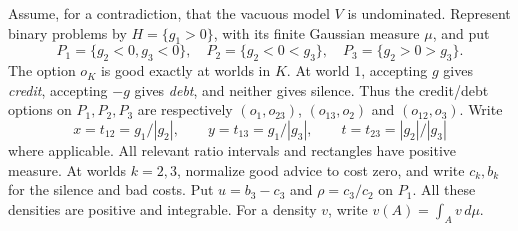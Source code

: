 \documentclass[11pt]{article}
\theoremstyle{remark}\newtheorem{remark}[theorem]{Remark}
\begin{document}
Assume, for a contradiction, that the vacuous model $V$ is undominated.
Represent binary problems by $H=\{g_1>0\}$, with its finite Gaussian measure
$\mu$, and put
\[
 P_1=\{g_2<0,g_3<0\},\quad P_2=\{g_2<0<g_3\},\quad
 P_3=\{g_2>0>g_3\}.
\]
The option $o_K$ is good exactly at worlds in $K$. At world $1$, accepting
$g$ gives \emph{credit}, accepting $-g$ gives \emph{debt}, and neither gives
silence. Thus the credit/debt options on $P_1,P_2,P_3$ are respectively
$(o_1,o_{23})$, $(o_{13},o_2)$ and $(o_{12},o_3)$.
Write
\[
 x=t_{12}=g_1/|g_2|,\qquad y=t_{13}=g_1/|g_3|,\qquad
 t=t_{23}=|g_2|/|g_3|
\]
where applicable. All relevant ratio intervals and rectangles have positive
measure. At worlds $k=2,3$, normalize good advice to cost zero, and write
$c_k,b_k$ for the silence and bad costs. Put $u=b_3-c_3$ and
$\rho=c_3/c_2$ on $P_1$. All these densities are positive and integrable.
For a density $v$, write $v(A)=\int_Av\,d\mu$.
\end{document}
